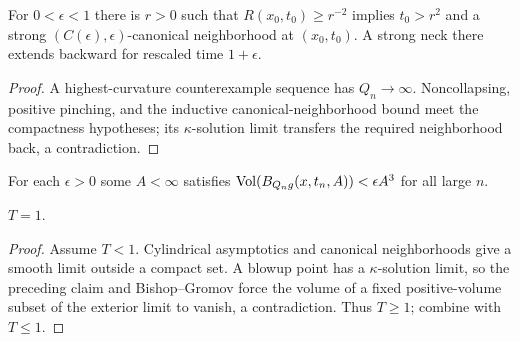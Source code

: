 \begin{theorem}
\label{thm:standard-solution-canonical-neighborhoods}
\label{R_0cannbhd}

For $0<\epsilon<1$ there is $r>0$ such that $R(x_0,t_0)\ge r^{-2}$
implies $t_0>r^2$ and a strong $(C(\epsilon),\epsilon)$-canonical
neighborhood at $(x_0,t_0)$. A strong neck there extends backward for
rescaled time $1+\epsilon$.
\end{theorem}
\begin{proof}
\sketch A highest-curvature counterexample sequence has $Q_n\to\infty$.
Noncollapsing, positive pinching, and the inductive canonical-neighborhood
bound meet the compactness hypotheses; its $\kappa$-solution limit transfers
the required neighborhood back, a contradiction.
\end{proof}

\begin{claim}
\label{claim:kappa-solution-volume-ratio-small}

For each $\epsilon>0$ some $A<\infty$ satisfies
$\operatorname{Vol}(B_{Q_ng}(x,t_n,A))<\epsilon A^3$ for all large $n$.
\end{claim}

\begin{theorem}[The standard flow exists exactly on $[0,1)$]
\label{thm:standard-solution-time-interval-one}

$T=1$.
\end{theorem}
\begin{proof}
\sketch Assume $T<1$. Cylindrical asymptotics and canonical neighborhoods
give a smooth limit outside a compact set. A blowup point has a
$\kappa$-solution limit, so the preceding claim and Bishop--Gromov force the
volume of a fixed positive-volume subset
of the exterior limit to vanish, a contradiction. Thus $T\ge1$; combine
with $T\le1$.
\end{proof}

